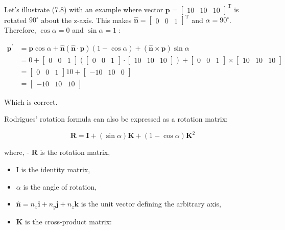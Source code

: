 \documentclass[10pt]{article}
\begin{document}
Let's illustrate (7.8) with an example where vector $\mathbf{p}=\left[\begin{array}{lll}10 & 10 & 10\end{array}\right]^{\mathrm{T}}$ is rotated $90^{\circ}$ about the z-axis. This makes $\hat{\mathbf{n}}=\left[\begin{array}{lll}0 & 0 & 1\end{array}\right]^{\mathrm{T}}$ and $\alpha=90^{\circ}$. Therefore, $\cos \alpha=0$ and $\sin \alpha=1$ :

$$
\begin{aligned}
\mathbf{p}^{\prime} & =\mathbf{p} \cos \alpha+\hat{\mathbf{n}}(\hat{\mathbf{n}} \cdot \mathbf{p})(1-\cos \alpha)+(\hat{\mathbf{n}} \times \mathbf{p}) \sin \alpha \\
& =0+\left[\begin{array}{llll}
0 & 0 & 1
\end{array}\right]\left(\left[\begin{array}{lll}
0 & 0 & 1
\end{array}\right] \cdot\left[\begin{array}{llll}
10 & 10 & 10
\end{array}\right]\right)+\left[\begin{array}{lll}
0 & 0 & 1
\end{array}\right] \times\left[\begin{array}{lll}
10 & 10 & 10
\end{array}\right] \\
& =\left[\begin{array}{lll}
0 & 0 & 1
\end{array}\right] 10+\left[\begin{array}{llll}
-10 & 10 & 0
\end{array}\right] \\
& =\left[\begin{array}{lll}
-10 & 10 & 10
\end{array}\right]
\end{aligned}
$$

Which is correct.

Rodrigues' rotation formula can also be expressed as a rotation matrix:

$$
\mathbf{R}=\mathbf{I}+(\sin \alpha) \mathbf{K}+(1-\cos \alpha) \mathbf{K}^{2}
$$

where, - $\mathbf{R}$ is the rotation matrix,

\begin{itemize}
  \item I is the identity matrix,

  \item $\alpha$ is the angle of rotation,

  \item $\hat{\mathbf{n}}=n_{x} \mathbf{i}+n_{y} \mathbf{j}+n_{z} \mathbf{k}$ is the unit vector defining the arbitrary axis,

  \item $\mathbf{K}$ is the cross-product matrix:

\end{itemize}
\end{document}
